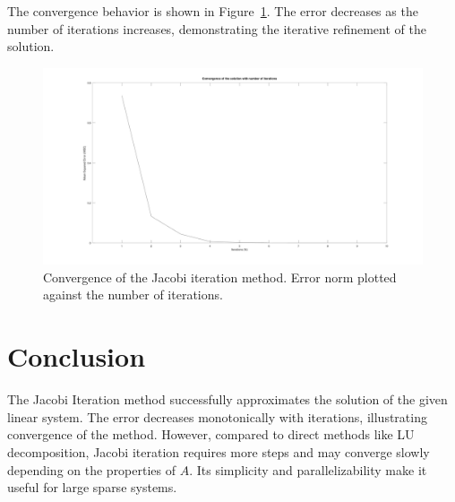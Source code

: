 The convergence behavior is shown in Figure~\ref{fig:a4}. The error decreases as the number of iterations increases, demonstrating the iterative refinement of the solution.

\begin{figure}[h!]
  \centering
  \includegraphics[width=1.0\textwidth]{a4.jpg}
  \caption{Convergence of the Jacobi iteration method. Error norm plotted against the number of iterations.}
  \label{fig:a4}
\end{figure}

\section*{Conclusion}
The Jacobi Iteration method successfully approximates the solution of the given linear system. The error decreases monotonically with iterations, illustrating convergence of the method. However, compared to direct methods like LU decomposition, Jacobi iteration requires more steps and may converge slowly depending on the properties of $A$. Its simplicity and parallelizability make it useful for large sparse systems.
